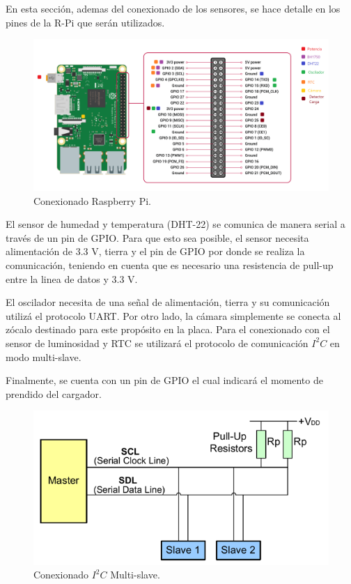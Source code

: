 
En esta sección, ademas del conexionado de los sensores, se hace detalle en los pines de la R-Pi que serán utilizados.

\begin{figure}[H]
	\centering
	\includegraphics[width=0.9\linewidth]{ImagenesIngenieria de Detalle/Conexionado_rpi}		
	\caption{Conexionado Raspberry Pi.}
	\label{fig:conexionado_Rpi}
\end{figure}

El sensor de humedad y temperatura (DHT-22) se comunica de manera serial a través de un pin de GPIO. Para que esto sea posible, el sensor necesita alimentación de 3.3 V, tierra y el pin de GPIO por donde se realiza la comunicación, teniendo en cuenta que es necesario una resistencia de pull-up entre la linea de datos y 3.3 V.

El oscilador necesita de una señal de alimentación, tierra y su comunicación utilizá el protocolo UART. Por otro lado, la cámara simplemente se conecta al zócalo destinado para este propósito en la placa. Para el conexionado con el sensor de luminosidad y RTC se utilizará el protocolo de comunicación $I^2C$ en modo multi-slave.

Finalmente, se cuenta con un pin de GPIO el cual indicará el momento de prendido del cargador.

\begin{figure}[H]
	\centering
	\includegraphics[width=0.7\linewidth]{ImagenesIngenieria de Detalle/I2C_conexionado}	
	\caption{Conexionado $I^2C$ Multi-slave.}
	\label{fig:conexionado_i2c}
\end{figure}


